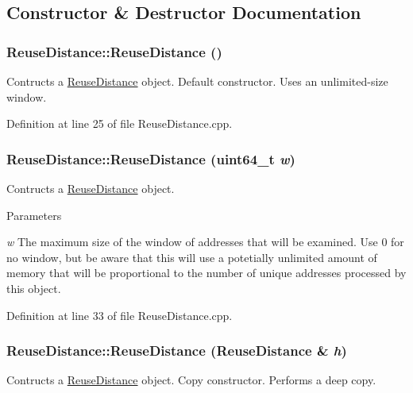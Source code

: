 \subsection{Constructor \& Destructor Documentation}
\hypertarget{class_reuse_distance_ac29589f6171319984a46fdc7d0497c79}{
\subsubsection[{ReuseDistance}]{\setlength{\rightskip}{0pt plus 5cm}ReuseDistance::ReuseDistance ()}}
\label{class_reuse_distance_ac29589f6171319984a46fdc7d0497c79}
Contructs a \hyperlink{class_reuse_distance}{ReuseDistance} object. Default constructor. Uses an unlimited-\/size window. 

Definition at line 25 of file ReuseDistance.cpp.

\hypertarget{class_reuse_distance_ab68a2d9df5c28571c3f8820c5344b2c1}{
\subsubsection[{ReuseDistance}]{\setlength{\rightskip}{0pt plus 5cm}ReuseDistance::ReuseDistance (uint64\_\-t {\em w})}}
\label{class_reuse_distance_ab68a2d9df5c28571c3f8820c5344b2c1}
Contructs a \hyperlink{class_reuse_distance}{ReuseDistance} object.


\begin{DoxyParams}{Parameters}
\item[{\em w}]The maximum size of the window of addresses that will be examined. Use 0 for no window, but be aware that this will use a potetially unlimited amount of memory that will be proportional to the number of unique addresses processed by this object. \end{DoxyParams}


Definition at line 33 of file ReuseDistance.cpp.

\hypertarget{class_reuse_distance_afff6c1153a623c687e1014df799c286d}{
\subsubsection[{ReuseDistance}]{\setlength{\rightskip}{0pt plus 5cm}ReuseDistance::ReuseDistance ({\bf ReuseDistance} \& {\em h})}}
\label{class_reuse_distance_afff6c1153a623c687e1014df799c286d}
Contructs a \hyperlink{class_reuse_distance}{ReuseDistance} object. Copy constructor. Performs a deep copy.


